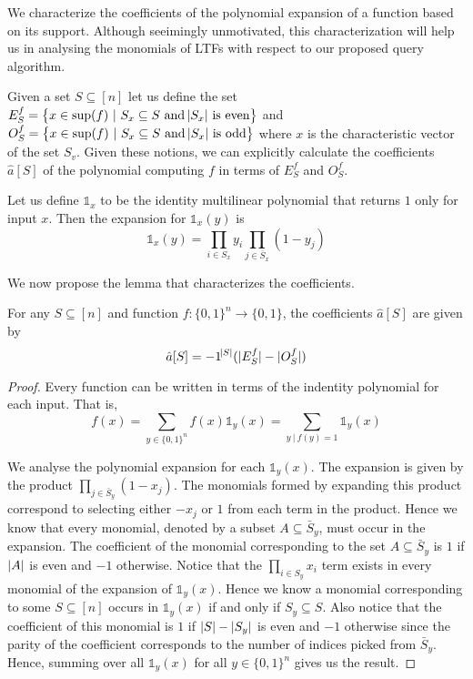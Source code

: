 We characterize the coefficients of the polynomial expansion of a function based on its support. Although seeimingly unmotivated, this characterization will help us in analysing the monomials of LTFs with respect to our proposed query algorithm.

Given a set $S\subseteq [n]$ let us define the set $E^f_S = \set{x\in \sup(f) \ | \ S_x \subseteq S \text{ and $\abs{S_x}$ is even} }$ and $O^f_S = \set{x\in \sup(f) \ | \ S_x \subseteq S \text{ and $\abs{S_x}$ is odd} }$ where $x$ is the characteristic vector of the set $S_v$. Given these notions, we can explicitly calculate the coefficients $\hat{a}[S]$ of the polynomial computing $f$ in terms of $E^f_S$ and $O^f_S$. 

\begin{definition}
	Let us define $\mathds{1}_x$ to be the identity multilinear polynomial that returns $1$ only for input $x$. Then the expansion for $\mathds{1}_x(y)$ is $$\mathds{1}_x(y) = \prod_{i \in S_x} y_i \prod_{j \in \bar{S}_x} (1 - y_j)$$
\end{definition}

We now propose the lemma that characterizes the coefficients. 

\begin{lemma}\label{lemma1}
	For any $S\subseteq [n]$ and function $f: \{0,1\}^n \rightarrow \{0,1\}$, the coefficients $\hat{a}[S]$ are given by 
    \[\hat{a}[S] = -1^{\abs{S}}(\vert E^f_S\vert - \vert O^f_S\vert)\]
	\begin{proof}
		Every function can be written in terms of the indentity polynomial for each input. That is, $$f(x) = \sum_{y \in \{0, 1\}^n} f(x) \mathds{1}_y(x) = \sum_{y \ | \ f(y) = 1} \mathds{1}_y(x)$$

		We analyse the polynomial expansion for each $\mathds{1}_y(x)$. The expansion is given by the product $\prod_{j \in \bar{S}_y} (1 - x_j)$. The monomials formed by expanding this product correspond to selecting either $-x_j$ or $1$ from each term in the product. Hence we know that every monomial, denoted by a subset $A \subseteq \bar{S}_y$, must occur in the expansion. The coefficient of the monomial corresponding to the set $A \subseteq\bar{S}_y$ is $1$ if $\vert A\vert$ is even and $-1$ otherwise. Notice that the $\prod_{i \in S_y} x_i$ term exists in every monomial of the expansion of $\mathds{1}_y(x)$. Hence we know a monomial corresponding to some $S \subseteq [n]$ occurs in $\mathds{1}_y(x)$ if and only if $S_y \subseteq S$. Also notice that the coefficient of this monomial is $1$ if $\vert S\vert - \vert S_y\vert$ is even and $-1$ otherwise since the parity of the coefficient corresponds to the number of indices picked from $\bar{S}_y$. Hence, summing over all $\mathds{1}_y(x)$ for all $y \in \{0,1\}^n$ gives us the result. 

	\end{proof}
\end{lemma} 
